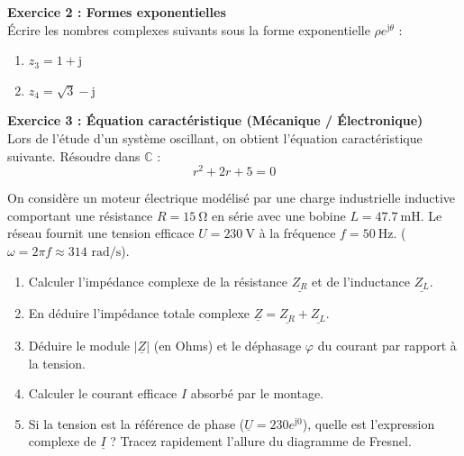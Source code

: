 \documentclass[11pt,a4paper]{article}
\newcommand{\jc}{\mathrm{j}} %
\newcommand{\cpx}[1]{\underline{#1}} %
\begin{document}
\vspace{0.5cm}
\textbf{Exercice 2 : Formes exponentielles} \\
Écrire les nombres complexes suivants sous la forme exponentielle $\rho e^{\jc\theta}$ :
\begin{enumerate}
    \item $z_3 = 1 + \jc$
    \item $z_4 = \sqrt{3} - \jc$
\end{enumerate}

\vspace{0.5cm}
\textbf{Exercice 3 : Équation caractéristique (Mécanique / Électronique)} \\
Lors de l'étude d'un système oscillant, on obtient l'équation caractéristique suivante. Résoudre dans $\mathbb{C}$ :
$$r^2 + 2r + 5 = 0$$

\vspace{0.5cm}
\begin{tcolorbox}[colback=yellow!5!white, colframe=orange, title=\textbf{Exercice 4 : Bilan sur un circuit RL et diagramme de Fresnel}]
On considère un moteur électrique modélisé par une charge industrielle inductive comportant une résistance $R = \SI{15}{\ohm}$ en série avec une bobine $L = \SI{47.7}{\milli\henry}$. Le réseau fournit une tension efficace $U = \SI{230}{\volt}$ à la fréquence $f = \SI{50}{\hertz}$. ($\omega = 2\pi f \approx 314 \text{ rad/s}$).
\begin{enumerate}
    \item Calculer l'impédance complexe de la résistance $\cpx{Z_R}$ et de l'inductance $\cpx{Z_L}$.
    \item En déduire l'impédance totale complexe $\cpx{Z} = \cpx{Z_R} + \cpx{Z_L}$.
    \item Déduire le module $|\cpx{Z}|$ (en Ohms) et le déphasage $\varphi$ du courant par rapport à la tension.
    \item Calculer le courant efficace $I$ absorbé par le montage.
    \item Si la tension est la référence de phase ($\cpx{U} = 230 e^{\jc 0}$), quelle est l'expression complexe de $\cpx{I}$ ? Tracez rapidement l'allure du diagramme de Fresnel.
\end{enumerate}
\end{tcolorbox}
\end{document}
